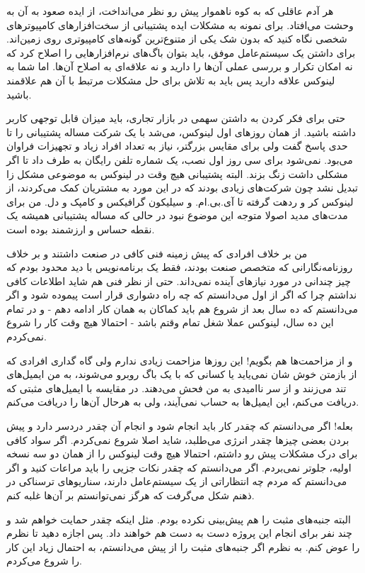 هر آدم عاقلی که به کوه ناهموار پیش رو نظر می‌انداخت، از ایده صعود به آن
به وحشت می‌افتاد. برای نمونه به مشکلات ایده پشتیبانی از سخت‌افزارهای
کامپیوترهای شخصی نگاه کنید که بدون شک یکی از متنوع‌ترین گونه‌های
کامپیوتری روی زمین‌اند. برای داشتن یک سیستم‌عامل موفق، باید بتوان باگ‌های
نرم‌افزارهایی را اصلاح کرد که نه امکان تکرار و بررسی عملی آن‌ها را دارید
و نه علاقه‌ای به اصلاح آن‌ها. اما شما به لینوکس علاقه دارید پس باید به
تلاش برای حل مشکلات مرتبط با آن هم علاقمند باشید.

حتی برای فکر کردن به داشتن سهمی در بازار تجاری، باید میزان قابل توجهی
کاربر داشته باشید. از همان روزهای اول لینوکس، می‌شد با یک شرکت مساله
پشتیبانی را تا حدی پاسخ گفت ولی برای مقایس بزرگتر، نیاز به تعداد افراد
زیاد و تجهیزات فراوان می‌بود. نمی‌شود برای سی روز اول نصب، یک شماره تلفن
رایگان به طرف داد تا اگر مشکلی داشت زنگ بزند. البته پشتیبانی هیچ وقت
در لینوکس به موضوعی مشکل زا تبدیل نشد چون شرکت‌های زیادی بودند که در
این مورد به مشتریان کمک می‌کردند، از لینوکس کر و
ردهت گرفته تا آی.بی.ام. و سیلیکون‌ گرافیکس و کامپک و دل. من برای مدت‌های
مدید اصولا متوجه این موضوع نبود در حالی که مساله پشتیبانی همیشه یک
نقطه حساس و ارزشمند بوده است.

من بر خلاف افرادی که پیش زمینه فنی کافی در صنعت داشتند و بر خلاف
روزنامه‌نگارانی که متخصص صنعت بودند، فقط یک برنامه‌نویس با دید محدود
بودم که چیز چندانی در مورد نیازهای آینده نمی‌داند. حتی از نظر فنی هم
شاید اطلاعات کافی نداشتم چرا که اگر از اول می‌دانستم که چه راه دشواری
قرار است پیموده شود و اگر می‌دانستم که ده سال بعد از شروع هم باید
کماکان به همان کار ادامه دهم - و در تمام این ده سال،‌ لینوکس عملا شغل
تمام وقتم باشد - احتمالا هیچ وقت کار را شروع نمی‌کردم.

و از مزاحمت‌ها هم بگویم! این روزها مزاحمت زیادی ندارم ولی گاه گداری
افرادی که از بازمتن خوش شان نمی‌یاید یا کسانی که با یک باگ روبرو
می‌شوند، به من ایمیل‌های تند می‌زنند و از سر ناامیدی به من فحش می‌دهند. در
مقایسه با ایمیل‌های مثبتی که دریافت می‌کنم، این ایمیل‌ها به حساب نمی‌آیند،
ولی به هرحال آن‌ها را دریافت می‌کنم.

بعله! اگر می‌دانستم که چقدر کار باید انجام شود و انجام آن چقدر دردسر
دارد و پیش بردن بعضی چیزها چقدر انرژی می‌طلبد، شاید اصلا شروع
نمی‌کردم. اگر سواد کافی برای درک مشکلات پیش رو داشتم، احتمالا هیچ وقت
لینوکس را از همان دو سه نسخه اولیه، جلوتر نمی‌بردم. اگر می‌دانستم که
چقدر نکات جزیی را باید مراعات کنید و اگر می‌دانستم که مردم چه انتظاراتی
از یک سیستم‌عامل دارند، سناریوهای ترسناکی در ذهنم شکل می‌گرفت که هرگز
نمی‌توانستم بر آن‌ها غلبه کنم.

البته جنبه‌های مثبت را هم پیش‌بینی نکرده بودم. مثل اینکه چقدر حمایت
خواهم شد و چند نفر برای انجام این پروژه دست به دست هم خواهند داد. پس
اجازه دهید تا نظرم را عوض کنم. به نظرم اگر جنبه‌های مثبت را از پیش
می‌دانستم، به احتمال زیاد این کار را شروع می‌کردم.
